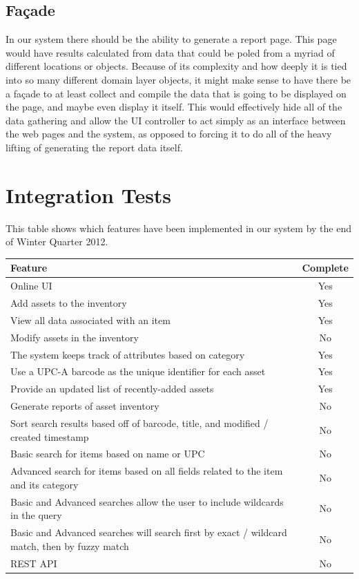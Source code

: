 \documentclass{article}
\begin{document}
\subsection{Fa\c{c}ade}
In our system there should be the ability to generate a report page. This page would have results calculated from data that could be poled from a myriad of different locations or objects. Because of its complexity and how deeply it is tied into so many different domain layer objects, it might make sense to have there be a façade to at least collect and compile the data that is going to be displayed on the page, and maybe even display it itself. This would effectively hide all of the data gathering and allow the UI controller to act simply as an interface between the web pages and the system, as opposed to forcing it to do all of the heavy lifting of generating the report data itself. \\

\section{Integration Tests}
This table shows which features have been implemented in our system by the end of Winter Quarter 2012.\\
\begin{tabular}{| l | c |}
\hline
\textbf{Feature}\label{feature} & \textbf{Complete}\\
\hline
\hline
Online UI & Yes \\
\hline
Add assets to the inventory & Yes \\
\hline
View all data associated with an item & Yes \\
\hline
Modify assets in the inventory & No \\
\hline
The system keeps track of attributes based on category & Yes \\
\hline
Use a UPC-A\label{upc} barcode as the unique identifier for each asset & Yes \\
\hline
Provide an updated list of recently-added assets & Yes \\
\hline
Generate reports of asset inventory & No \\
\hline
Sort search results based off of barcode, title, and modified / created timestamp & No \\
\hline
Basic search for items based on name or UPC & No \\
\hline
Advanced search for items based on all fields related to the item and its category & No \\
\hline
Basic and Advanced searches allow the user to include wildcards in the query & No \\
\hline
Basic and Advanced searches will search first by exact\label{exact} / wildcard\label{wild} match, then by fuzzy match\label{fuzzy} & No \\
\hline
REST API & No \\
\hline
\end{tabular}\label{rest}\\ \\ \\
\end{document}
